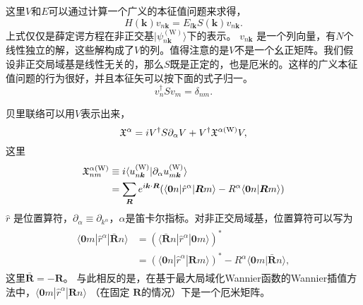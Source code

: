 这里$V$和$E$可以通过计算一个广义的本征值问题来求得，
\begin{equation}
H(\boldsymbol{k})v_{n\boldsymbol{k}}=E_{l\boldsymbol{k}}S(\boldsymbol{k})v_{n\boldsymbol{k}}.\label{eq:gep}
\end{equation}
上式仅仅是薛定谔方程在非正交基$|\psi_{n\boldsymbol{k}}^{(\text{W})}\rangle$下的表示。 $v_{n\boldsymbol{k}}$ 是一个列向量，有$N$个线性独立的解，这些解构成了$V$的列。值得注意的是$V$不是一个幺正矩阵。我们假设非正交局域基是线性无关的，那么$S$既是正定的，也是厄米的。这样的广义本征值问题的行为很好，并且本征矢可以按下面的式子归一。
\begin{equation}
v_{n}^{\dagger}Sv_{m}=\delta_{nm}.\label{eq:norm}
\end{equation}

贝里联络可以用$V$表示出来，
\begin{equation}
\mathfrak{X}^{\alpha}=iV^{\dagger}S\partial_{\alpha}V+V{}^{\dagger}\mathfrak{X}^{\alpha(\text{W})}V,\label{eq:A}
\end{equation}
这里
\begin{align}
\begin{split}
\mathfrak{X}_{nm}^{\alpha(\text{W})} & \equiv i\langle u_{n\boldsymbol{k}}^{(\text{W})}|\partial_{\alpha}u_{m\boldsymbol{k}}^{(\text{W})}\rangle\\
& =\sum_{\boldsymbol{R}}e^{i\boldsymbol{k}\cdot\boldsymbol{R}}(\langle\boldsymbol{0}n|\hat{r}^{\alpha}|\boldsymbol{R}m\rangle-R^{\alpha}\langle\boldsymbol{0}n|\boldsymbol{R}m\rangle)
\end{split}
\end{align}
$\hat{r}$ 是位置算符，$\partial_{\alpha}\equiv\partial_{k^{\alpha}}$，$\alpha$是笛卡尔指标。对非正交局域基，位置算符可以写为
\begin{align}
\begin{split}
\langle\boldsymbol{0}m|\hat{r}^{\alpha}|\bar{\boldsymbol{R}}n\rangle & =(\langle\bar{\boldsymbol{R}}n|\hat{r}^{\alpha}|\boldsymbol{0}m\rangle)^{*}\\
& =(\langle\boldsymbol{0}n|\hat{r}^{\alpha}|\boldsymbol{R}m\rangle)^{*}-R^{\alpha}\langle\boldsymbol{0}m|\bar{\boldsymbol{R}}n\rangle,
\end{split}
\end{align}
这里$\bar{\boldsymbol{R}}=-\boldsymbol{R}$。
与此相反的是，在基于最大局域化Wannier函数的Wannier插值方法中，$\langle\boldsymbol{0}m|\hat{r}^{\alpha}|\boldsymbol{R}n\rangle$ （在固定 $\boldsymbol{R}$的情况）下是一个厄米矩阵。 

